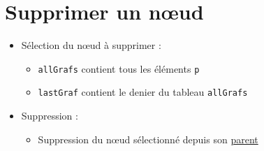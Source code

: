 \hypertarget{supprimer-un-nux153ud}{%
\section{Supprimer un nœud}\label{supprimer-un-nux153ud}}

\begin{english}

\begin{Shaded}
\begin{Highlighting}[]
 \NormalTok{() \{}
   \OperatorTok{=} \NormalTok{(}\NormalTok{)}\OperatorTok{;}

    \OperatorTok{\textgreater{}} \NormalTok{) \{}
      \OperatorTok{=}\NormalTok{)}\OperatorTok{;}
\OperatorTok{;}
\NormalTok{   \}}
   \NormalTok{ \{}
      \NormalTok{(}\NormalTok{)}\OperatorTok{;}
\NormalTok{   \}}
\NormalTok{\}}
\end{Highlighting}
\end{Shaded}

\end{english}

\begin{itemize}
\tightlist
\item
  Sélection du nœud à supprimer :

  \begin{itemize}
  \tightlist
  \item
    \textenglish{\texttt{allGrafs}} contient tous les éléments
    \textenglish{\texttt{p}}
  \item
    \textenglish{\texttt{lastGraf}} contient le denier du tableau
    \textenglish{\texttt{allGrafs}}
  \end{itemize}
\item
  Suppression :

  \begin{itemize}
  \tightlist
  \item
    Suppression du nœud sélectionné depuis son
    \href{https://developer.mozilla.org/en-US/docs/Web/API/Node/parentNode}{parent}
  \end{itemize}
\end{itemize}

